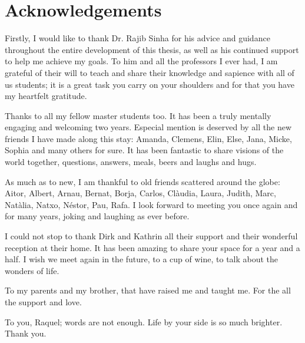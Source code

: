 \cleardoublepage %

\chapter*{Acknowledgements} %
Firstly, I would like to thank Dr. Rajib Sinha for his advice and guidance throughout the entire development of this thesis, as well as his continued support to help me achieve my goals. To him and all the professors I ever had, I am grateful of their will to teach and share their knowledge and sapience with all of us students; it is a great task you carry on your shoulders and for that you have my heartfelt gratitude.

Thanks to all my fellow master students too. It has been a truly mentally engaging and welcoming two years. Especial mention is deserved by all the new friends I have made along this stay: Amanda, Clemens, Elin, Else, Jana, Micke, Sophia and many others for sure. It has been fantastic to share visions of the world together, questions, answers, meals, beers and laughs and hugs.

As much as to new, I am thankful to old friends scattered around the globe: Aitor, Albert, Arnau, Bernat, Borja, Carlos, Clàudia, Laura, Judith, Marc, Natàlia, Natxo, Néstor, Pau, Rafa. I look forward to meeting you once again and for many years, joking and laughing as ever before.

I could not stop to thank Dirk and Kathrin all their support and their wonderful reception at their home. It has been amazing to share your space for a year and a half. I wish we meet again in the future, to a cup of wine, to talk about the wonders of life.

To my parents and my brother, that have raised me and taught me. For the all the support and love.

To you, Raquel; words are not enough. Life by your side is so much brighter. Thank you.



\cleardoublepage %